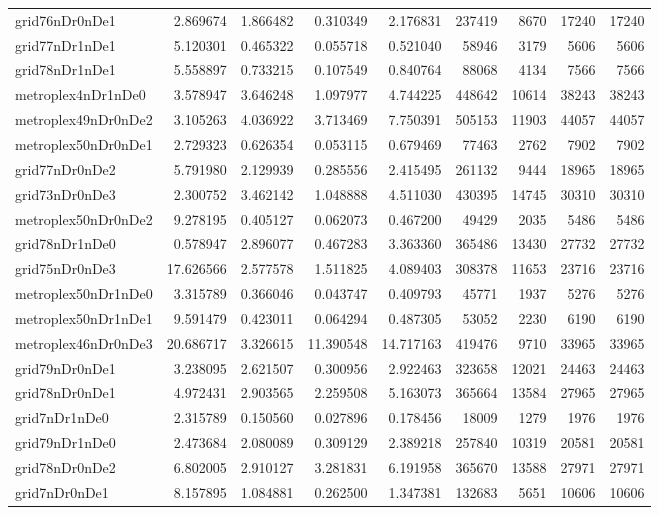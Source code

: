 \documentclass[../../../thesis.tex]{subfiles}
\begin{document}
\begin{longtable}{|l|r|r|r|r|r|r|r|r|}
grid76nDr0nDe1 & 2.869674 & 1.866482 & 0.310349 & 2.176831 & 237419 & 8670 & 17240 & 17240 \\
grid77nDr1nDe1 & 5.120301 & 0.465322 & 0.055718 & 0.521040 & 58946 & 3179 & 5606 & 5606 \\
grid78nDr1nDe1 & 5.558897 & 0.733215 & 0.107549 & 0.840764 & 88068 & 4134 & 7566 & 7566 \\
metroplex4nDr1nDe0 & 3.578947 & 3.646248 & 1.097977 & 4.744225 & 448642 & 10614 & 38243 & 38243 \\
metroplex49nDr0nDe2 & 3.105263 & 4.036922 & 3.713469 & 7.750391 & 505153 & 11903 & 44057 & 44057 \\
metroplex50nDr0nDe1 & 2.729323 & 0.626354 & 0.053115 & 0.679469 & 77463 & 2762 & 7902 & 7902 \\
grid77nDr0nDe2 & 5.791980 & 2.129939 & 0.285556 & 2.415495 & 261132 & 9444 & 18965 & 18965 \\
grid73nDr0nDe3 & 2.300752 & 3.462142 & 1.048888 & 4.511030 & 430395 & 14745 & 30310 & 30310 \\
metroplex50nDr0nDe2 & 9.278195 & 0.405127 & 0.062073 & 0.467200 & 49429 & 2035 & 5486 & 5486 \\
grid78nDr1nDe0 & 0.578947 & 2.896077 & 0.467283 & 3.363360 & 365486 & 13430 & 27732 & 27732 \\
grid75nDr0nDe3 & 17.626566 & 2.577578 & 1.511825 & 4.089403 & 308378 & 11653 & 23716 & 23716 \\
metroplex50nDr1nDe0 & 3.315789 & 0.366046 & 0.043747 & 0.409793 & 45771 & 1937 & 5276 & 5276 \\
metroplex50nDr1nDe1 & 9.591479 & 0.423011 & 0.064294 & 0.487305 & 53052 & 2230 & 6190 & 6190 \\
metroplex46nDr0nDe3 & 20.686717 & 3.326615 & 11.390548 & 14.717163 & 419476 & 9710 & 33965 & 33965 \\
grid79nDr0nDe1 & 3.238095 & 2.621507 & 0.300956 & 2.922463 & 323658 & 12021 & 24463 & 24463 \\
grid78nDr0nDe1 & 4.972431 & 2.903565 & 2.259508 & 5.163073 & 365664 & 13584 & 27965 & 27965 \\
grid7nDr1nDe0 & 2.315789 & 0.150560 & 0.027896 & 0.178456 & 18009 & 1279 & 1976 & 1976 \\
grid79nDr1nDe0 & 2.473684 & 2.080089 & 0.309129 & 2.389218 & 257840 & 10319 & 20581 & 20581 \\
grid78nDr0nDe2 & 6.802005 & 2.910127 & 3.281831 & 6.191958 & 365670 & 13588 & 27971 & 27971 \\
grid7nDr0nDe1 & 8.157895 & 1.084881 & 0.262500 & 1.347381 & 132683 & 5651 & 10606 & 10606 \\

\end{longtable}
\end{document}
